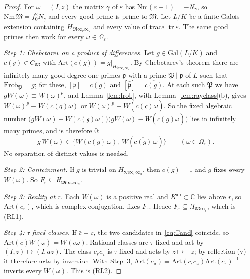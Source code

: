 \documentclass[11pt]{amsart}
\numberwithin{equation}{section}
\theoremstyle{plain}
\theoremstyle{definition}
\theoremstyle{remark}
\newcommand{\Kab}{K^{\mathrm{ab}}}
\begin{document}
\begin{proof}
For \(\omega=(I,z)\) the matrix \(\gamma\) of \(\varepsilon\) has \(\mathrm{Nm}(\varepsilon-1)=-N_\gamma\), so \(\mathrm{Nm}\,\mathfrak M=f_0^2N_\gamma\) and every good prime is prime to \(\mathfrak M\). Let \(L/K\) be a finite Galois extension containing \(H_{\mathfrak M\infty_r\infty_u}\) and every value of trace \(\operatorname{tr}\varepsilon\). The same good primes then work for every \(\omega\in\Omega_\varepsilon\).

\emph{Step 1: Chebotarev on a product of differences.} Let \(g\in\mathrm{Gal}(L/K)\) and \(c(g)\in C_{\mathfrak M}\) with \(\mathrm{Art}(c(g))=g|_{H_{\mathfrak M\infty_r\infty_u}}\). By Chebotarev's theorem \cite{Ch} there are infinitely many good degree-one primes \(\mathfrak p\) with a prime \(\mathfrak P\mid\mathfrak p\) of \(L\) such that \(\mathrm{Frob}_{\mathfrak P}=g\); for these, \([\mathfrak p]=c(g)\) and \([\bar{\mathfrak p}]=\overline{c(g)}\). At each such \(\mathfrak P\) we have \(gW(\omega)\equiv W(\omega)^p\), and Lemma~\ref{lem:frob}, with Lemma~\ref{lem:rayclass}(b), gives \(W(\omega)^p\equiv W(c(g)\omega)\) or \(W(\omega)^p\equiv W(\overline{c(g)}\omega)\). So the fixed algebraic number \(\bigl(gW(\omega)-W(c(g)\omega)\bigr)\bigl(gW(\omega)-W(\overline{c(g)}\omega)\bigr)\) lies in infinitely many primes, and is therefore \(0\):
\begin{equation}\tag{Cand}\label{eq:Cand}
g\,W(\omega)\in\bigl\{W(c(g)\,\omega),\ W(\overline{c(g)}\,\omega)\bigr\}\qquad(\omega\in\Omega_\varepsilon).
\end{equation}
No separation of distinct values is needed.

\emph{Step 2: Containment.} If \(g\) is trivial on \(H_{\mathfrak M\infty_r\infty_u}\), then \(c(g)=1\) and \(g\) fixes every \(W(\omega)\). So \(F_\varepsilon\subseteq H_{\mathfrak M\infty_r\infty_u}\).

\emph{Step 3: Reality at \(r\).} Each \(W(\omega)\) is a positive real and \(\Kab\subset\mathbb C\) lies above \(r\), so \(\mathrm{Art}(c_r)\), which is complex conjugation, fixes \(F_\varepsilon\). Hence \(F_\varepsilon\subseteq H_{\mathfrak M\infty_u}\), which is (RL1).

\emph{Step 4: \(\tau\)-fixed classes.} If \(\bar c=c\), the two candidates in~\eqref{eq:Cand} coincide, so \(\mathrm{Art}(c)W(\omega)=W(c\omega)\). Rational classes are \(\tau\)-fixed and act by \((I,z)\mapsto(I,az)\). The class \(c_rc_u\) is \(\tau\)-fixed and acts by \(z\mapsto-z\); by reflection (v) it therefore acts by inversion. With Step~3, \(\mathrm{Art}(c_u)=\mathrm{Art}(c_rc_u)\mathrm{Art}(c_r)^{-1}\) inverts every \(W(\omega)\). This is (RL2).


\end{proof}
\end{document}
